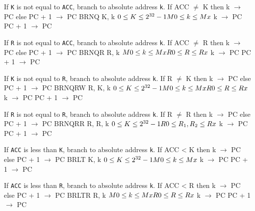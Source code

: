 \documentclass[titlepage]{scrartcl}
\begin{document}
{If \texttt{K} is not equal to \texttt{ACC}, branch to absolute address \texttt{k}.}
{If ACC $\neq$ K then k $\rightarrow$ PC else PC + 1 $\rightarrow$ PC}
{BRNQ K, k}
{$0 \leq K \leq 2^{32} - 1 \hfill \break M0 \leq k \leq Mx$}
{k $\rightarrow$ PC \hfill \break PC + 1 $\rightarrow$ PC}
{}
{\srtable{}{}{}{}}

{If \texttt{R} is not equal to \texttt{ACC}, branch to absolute address \texttt{k}.}
{If ACC $\neq$ R then k $\rightarrow$ PC else PC + 1 $\rightarrow$ PC}
{BRNQR R, k}
{$M0 \leq k \leq Mx \hfill \break R0 \leq R \leq Rx$}
{k $\rightarrow$ PC \hfill \break PC + 1 $\rightarrow$ PC}
{}
{\srtable{}{}{}{}}

{If \texttt{K} is not equal to \texttt{R}, branch to absolute address \texttt{k}.}
{If R $\neq$ K then k $\rightarrow$ PC else PC + 1 $\rightarrow$ PC}
{BRNQRW R, K, k}
{$0 \leq K \leq 2^{32} - 1 \hfill \break M0 \leq k \leq Mx \hfill \break R0 \leq R \leq Rx$}
{k $\rightarrow$ PC \hfill \break PC + 1 $\rightarrow$ PC}
{}
{\srtable{}{}{}{}}

{If \texttt{R} is not equal to \texttt{R}, branch to absolute address \texttt{k}.}
{If R $\neq$ R then k $\rightarrow$ PC else PC + 1 $\rightarrow$ PC}
{BRNQRR R, R, k}
{$0 \leq K \leq 2^{32} - 1 \hfill \break R0 \leq R_{1}, R_{2} \leq Rx$}
{k $\rightarrow$ PC \hfill \break PC + 1 $\rightarrow$ PC}
{}
{\srtable{}{}{}{}}

{If \texttt{ACC} is less than \texttt{K}, branch to absolute address \texttt{k}.}
{If ACC < K then k $\rightarrow$ PC else PC + 1 $\rightarrow$ PC}
{BRLT K, k}
{$0 \leq K \leq 2^{32} - 1 \hfill \break M0 \leq k \leq Mx$}
{k $\rightarrow$ PC \hfill \break PC + 1 $\rightarrow$ PC}
{}
{\srtable{}{}{}{}}

{If \texttt{ACC} is less than \texttt{R}, branch to absolute address \texttt{k}.}
{If ACC < R then k $\rightarrow$ PC else PC + 1 $\rightarrow$ PC}
{BRLTR R, k}
{$M0 \leq k \leq Mx \hfill \break R0 \leq R \leq Rx$}
{k $\rightarrow$ PC \hfill \break PC + 1 $\rightarrow$ PC}
{}
{\srtable{}{}{}{}}
\end{document}
